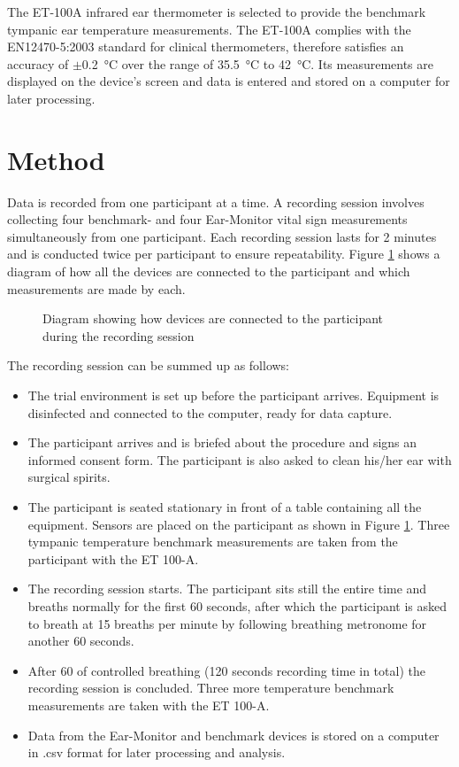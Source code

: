 \medskip

The ET-100A infrared ear thermometer is selected to provide the benchmark tympanic ear temperature measurements. The ET-100A complies with the EN12470-5:2003 standard for clinical thermometers, therefore satisfies an accuracy of $\pm$\SI{0.2}{\celsius} over the range of \SI{35.5}{\celsius} to \SI{42}{\celsius}. Its measurements are displayed on the device's screen and data is entered and stored on a computer for later processing.


\section{Method}
Data is recorded from one participant at a time. A recording session involves collecting four benchmark- and four Ear-Monitor vital sign measurements simultaneously from one participant. Each recording session lasts for 2 minutes and is conducted twice per participant to ensure repeatability. Figure \ref{fig:SetUp} shows a diagram of how all the devices are connected to the participant and which measurements are made by each.

\begin{figure}
\centering
\graphicspath{{figs/}}

\caption{Diagram showing how devices are connected to the participant during the recording session}
\label{fig:SetUp}
\end{figure}

\medskip

The recording session can be summed up as follows:

\begin{itemize}
\item The trial environment is set up before the participant arrives. Equipment is disinfected and connected to the computer, ready for data capture. 
\item The participant arrives and is briefed about the procedure and signs an informed consent form. The participant is also asked to clean his/her ear with surgical spirits.
\item The participant is seated stationary in front of a table containing all the equipment. Sensors are placed on the participant as shown in Figure \ref{fig:SetUp}. Three tympanic temperature benchmark measurements are taken from the participant with the ET 100-A.
\item The recording session starts. The participant sits still the entire time and breaths normally for the first 60 seconds, after which the participant is asked to breath at 15 breaths per minute by following breathing metronome for another 60 seconds.
\item After 60 of controlled breathing (120 seconds recording time in total) the recording session is concluded. Three more temperature benchmark measurements are taken with the ET 100-A.
\item Data from the Ear-Monitor and benchmark devices is stored on a computer in .csv format for later processing and analysis.
\end{itemize}


